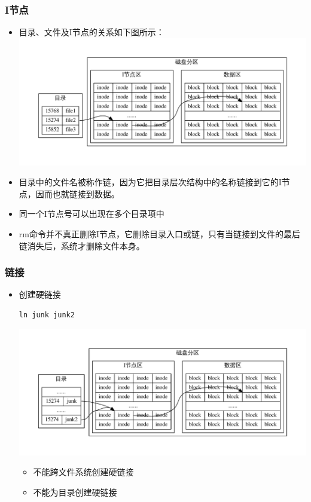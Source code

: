 \documentclass[xcolor=svgnames,presentation]{beamer}
\begin{document}
\begin{frame}
\frametitle{I节点}
\label{sec-1-1-5}
\begin{itemize}

\item 目录、文件及I节点的关系如下图所示：\\
\label{sec-1-1-5-1}%
\includegraphics[width=.9\linewidth]{img/inode2.pdf}

\item 目录中的文件名被称作链，因为它把目录层次结构中的名称链接到它的I节点，因而也就链接到数据。
\label{sec-1-1-5-2}%

\item 同一个I节点号可以出现在多个目录项中
\label{sec-1-1-5-3}%

\item rm命令并不真正删除I节点，它删除目录入口或链，只有当链接到文件的最后链消失后，系统才删除文件本身。
\label{sec-1-1-5-4}%
\end{itemize} %
\end{frame}
\begin{frame}[fragile]
\frametitle{链接}
\label{sec-1-1-6}
\begin{itemize}

\item 创建硬链接\\
\label{sec-1-1-6-1}%
\begin{verbatim}
ln junk junk2
\end{verbatim}
\includegraphics[width=.9\linewidth]{img/inode3.pdf}
\begin{itemize}

\item 不能跨文件系统创建硬链接
\label{sec-1-1-6-1-1}%

\item 不能为目录创建硬链接
\label{sec-1-1-6-1-2}%
\end{itemize} %
\end{itemize} %
\end{frame}
\end{document}
